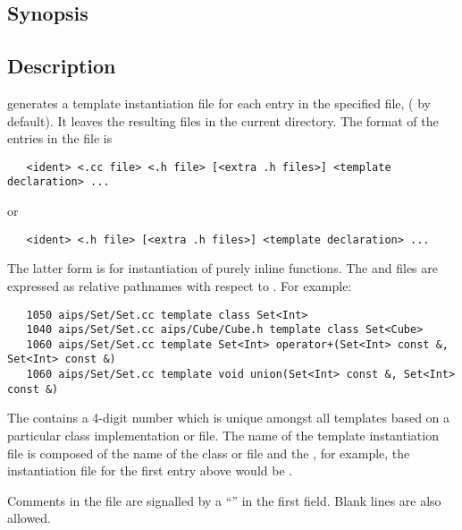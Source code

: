 \subsection*{Synopsis}
 
\begin{synopsis}
\end{synopsis}
 
\subsection*{Description}
 
 generates a template instantiation file for each entry in the
specified file, ( by default).  It leaves the resulting
 files in the current directory.  The format of the entries in the
 file is

\begin{verbatim}
   <ident> <.cc file> <.h file> [<extra .h files>] <template declaration> ...
\end{verbatim}

\noindent
or

\begin{verbatim}
   <ident> <.h file> [<extra .h files>] <template declaration> ...
\end{verbatim}

\noindent
The latter form is for instantiation of purely inline functions.  The
 and  files are expressed as relative pathnames with
respect to .  For example:

\begin{verbatim}
   1050 aips/Set/Set.cc template class Set<Int>
   1040 aips/Set/Set.cc aips/Cube/Cube.h template class Set<Cube>
   1060 aips/Set/Set.cc template Set<Int> operator+(Set<Int> const &, Set<Int> const &)
   1060 aips/Set/Set.cc template void union(Set<Int> const &, Set<Int> const &)
\end{verbatim}

\noindent
The  contains a 4-digit number which is unique amongst all
templates based on a particular class implementation  or 
file.  The name of the template instantiation  file is composed of
the name of the class  or  file and the , for
example, the instantiation file for the first entry above would be
.

Comments in the  file are signalled by a ``\code{\#}'' in the
first field.  Blank lines are also allowed.


